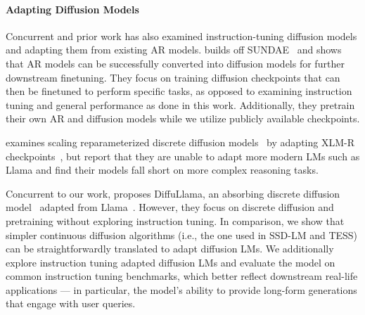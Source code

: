 \paragraph{Adapting Diffusion Models} Concurrent and prior work has also examined instruction-tuning diffusion models and adapting them from existing AR models.
\citet{han2024transferlearningtextdiffusion} builds off SUNDAE~\citep{savinov2022stepunrolled} and shows that AR models can be successfully converted into diffusion models for further downstream finetuning. They focus on training diffusion checkpoints that can then be finetuned to perform specific tasks, as opposed to examining instruction tuning and general performance as done in this work. Additionally, they pretrain their own AR and diffusion models while we utilize publicly available checkpoints.

\citet{ye2023diffusionlanguagemodelsperform} examines scaling reparameterized discrete diffusion models~\citep{zheng2024reparameterizeddiscretediffusionmodel} by adapting XLM-R checkpoints~\citep{conneau-etal-2020-unsupervised}, but report that they are unable to adapt more modern LMs such as Llama and find their models fall short on more complex reasoning tasks.

Concurrent to our work, \citet{gong2024scalingdiffusionlm} proposes DiffuLlama, an absorbing discrete diffusion model~\citep{austin2021structured} adapted from Llama~\cite{touvron2023llama2openfoundation}. However, they focus on discrete diffusion and pretraining without exploring instruction tuning. In comparison, we show that simpler continuous diffusion algorithms (i.e., the one used in SSD-LM and TESS) can be straightforwardly translated to adapt diffusion LMs. We additionally explore instruction tuning adapted diffusion LMs and evaluate the model on common instruction tuning benchmarks, which better reflect downstream real-life applications --- in particular, the model’s ability to provide long-form generations that engage with user queries. 

